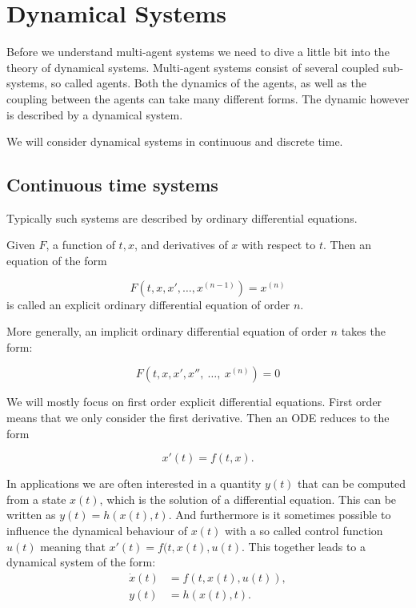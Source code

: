 


\section{Dynamical Systems}

Before we understand multi-agent systems we need to dive a little bit into the theory of dynamical systems. Multi-agent systems consist of several coupled sub-systems, so called agents. Both the dynamics of the agents, as well as the coupling between the agents can take many different forms. The dynamic however is described by a dynamical system. 

We will consider dynamical systems in continuous and discrete time.


\subsection{Continuous time systems}

Typically such systems are described by ordinary differential equations.
\begin{definition}
Given $F$, a function of $t, x$, and derivatives of $x$ with respect to $t$. Then an equation of the form

\[F\left(t,x,x',\ldots ,x^{(n-1)}\right)=x^{(n)}\]
is called an explicit ordinary differential equation of order $n$.

More generally, an implicit ordinary differential equation of order $n$ takes the form:

\[ F\left(t,x,x',x'',\ \ldots ,\ x^{(n)}\right)=0\]
\end{definition}

We will mostly  focus on first order explicit differential equations. First order means that we only consider the first derivative. Then an ODE reduces to the form

\[x'(t)=f(t,x).\]


In applications we are often interested in a quantity $y(t)$ that can be computed from a state $x(t)$, which is the solution of a differential equation. This can be written as $y(t)=h(x(t),t)$. And furthermore is it sometimes possible to influence the dynamical behaviour of $x(t)$ with a so called control function $u(t)$ meaning that $x'(t)=f(t,x(t),u(t)$.
This together leads to a dynamical system of the form:
\begin{subequations}
\label{nonsys}
\begin{align}
\dot{x}(t)&=f(t,x(t),u(t)),\\
y(t)&=h(x(t),t).
\end{align}
\end{subequations}


